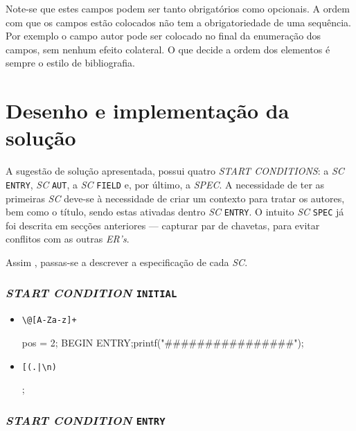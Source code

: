 Note-se que estes campos podem ser tanto obrigatórios como opcionais.
A ordem com que os campos estão colocados não tem a obrigatoriedade de uma
sequência. Por exemplo o campo autor pode ser colocado no final da enumeração
dos campos, sem nenhum efeito colateral. O que decide a ordem dos elementos
é sempre o estilo de bibliografia.


\section{Desenho e implementação da solução}
\label{sec:des:b2}

A sugestão de solução apresentada, possui quatro \emph{START CONDITIONS}:
a \emph{SC} \texttt{ENTRY}, \emph{SC} \texttt{AUT}, a \emph{SC} \texttt{FIELD}
e, por último, a \emph{SPEC}. A necessidade de ter as primeiras \emph{SC}
deve-se à necessidade de criar um contexto para tratar os autores, bem como
o título, sendo estas ativadas dentro \emph{SC} \texttt{ENTRY}. O intuito \emph{SC}
\texttt{SPEC} já foi descrita em secções anteriores --- capturar par de
chavetas, para evitar conflitos com as outras \emph{ER's}.

Assim , passas-se a descrever a especificação de cada \emph{SC}.


\subsubsection{\emph{START CONDITION} \texttt{INITIAL}}

\begin{itemize}
\item 

\begin{verbatim}
\@[A-Za-z]+
\end{verbatim}

{pos = 2; BEGIN ENTRY;printf("\n\n\n################\n");}

\item 

\begin{verbatim}
[(.|\n)                            
\end{verbatim}
{;}



\end{itemize}



\subsubsection{\emph{START CONDITION} \texttt{ENTRY}}

